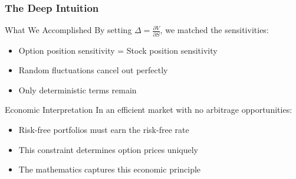 \documentclass{beamer}
\begin{document}
\begin{frame}
\frametitle{The Deep Intuition}
\begin{block}{What We Accomplished}
By setting $\Delta = \frac{\partial V}{\partial S}$, we matched the sensitivities:
\begin{itemize}
\item Option position sensitivity = Stock position sensitivity
\item Random fluctuations cancel out perfectly
\item Only deterministic terms remain
\end{itemize}
\end{block}

\begin{block}{Economic Interpretation}
In an efficient market with no arbitrage opportunities:
\begin{itemize}
\item Risk-free portfolios must earn the risk-free rate
\item This constraint determines option prices uniquely
\item The mathematics captures this economic principle
\end{itemize}
\end{block}
\end{frame}
\end{document}
